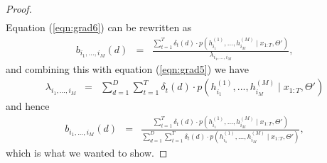 \documentclass{amsart}
\begin{document}
\begin{proof}
\begin{eqnarray}
\end{eqnarray}
Equation (\ref{eqn:grad6}) can be rewritten as 
\begin{eqnarray*}
b_{i_1,...,i_M}(d) &=& \frac{\sum_{t=1}^T\delta_t(d)\cdot p(h_{i_1}^{(1)},...,h_{i_M}^{(M)}\mid x_{1:T},\Theta')}{\lambda_{i_1,...,i_M}},
\end{eqnarray*}
and combining this with equation (\ref{eqn:grad5}) we have
\begin{eqnarray*}
\lambda_{i_1,...,i_M} & = & \sum_{d=1}^D\sum_{t=1}^T\delta_t(d)\cdot p(h_{i_1}^{(1)},...,h_{i_M}^{(M)}\mid x_{1:T},\Theta')
\end{eqnarray*}
and hence 
\begin{eqnarray*}
b_{i_1,...,i_M}(d) &=& \frac{\sum_{t=1}^T\delta_t(d)\cdot p(h_{i_1}^{(1)},...,h_{i_M}^{(M)}\mid x_{1:T},\Theta')}{\sum_{d=1}^D\sum_{t=1}^T\delta_t(d)\cdot p(h_{i_1}^{(1)},...,h_{i_M}^{(M)}\mid x_{1:T},\Theta')},
\end{eqnarray*}
which is what we wanted to show.


\end{proof}
\end{document}
